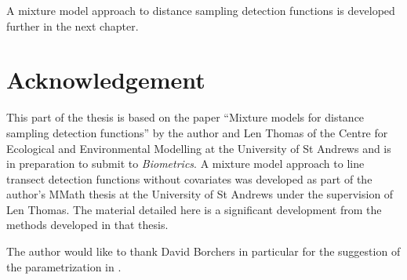 A mixture model approach to distance sampling detection functions is developed further in the next chapter.

\section{Acknowledgement}

This part of the thesis is based on the paper ``Mixture models for distance sampling detection functions'' by the author and Len Thomas of the Centre for Ecological and Environmental Modelling at the University of St Andrews and is in preparation to submit to \textit{Biometrics}. A mixture model approach to line transect detection functions without covariates was developed as part of the author's MMath thesis at the University of St Andrews under the supervision of Len Thomas. The material detailed here is a significant development from the methods developed in that thesis. 

The author would like to thank David Borchers in particular for the suggestion of the parametrization in .

